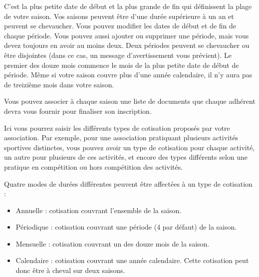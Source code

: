 \documentclass[a4paper,10pt,oneside,french]{sphinxmanual}
\begin{document}
C’est la plus petite date de début et la plus grande de fin qui définissent la plage de votre saison. Vos saisons peuvent être d’une durée supérieure à un an et peuvent se chevaucher.
Vous pouvez modifier les dates de début et de fin de chaque période. Vous pouvez aussi ajouter ou supprimer une période, mais vous devez toujours en avoir au moins deux.
Deux périodes peuvent se chevaucher ou être disjointes (dans ce cas, un message d’avertissement vous prévient).
Le premier des douze mois commence le mois de la plus petite date de début de période. Même si votre saison couvre plus d’une année calendaire, il n’y aura pas de treizième mois dans votre saison.

Vous pouvez associer à chaque saison une liste de documents que chaque adhérent devra vous fournir pour finaliser son inscription.
\begin{quote}

\noindent{}
\end{quote}

\begin{quote}

\noindent{}
\end{quote}

Ici vous pourrez saisir les différents types de cotisation proposés par votre association. Par exemple, pour une association pratiquant plusieurs activités sportives distinctes, vous pouvez avoir un type de cotisation pour chaque activité, un autre pour plusieurs de ces activités, et encore des types différents selon une pratique en compétition ou hors compétition des activités.

Quatre modes de durées différentes peuvent être affectées à un type de cotisation :
\begin{itemize}
\item {} 
Annuelle : cotisation couvrant l’ensemble de la saison.

\item {} 
Périodique : cotisation couvrant une période (4 par défaut) de la saison.

\item {} 
Mensuelle : cotisation couvrant un des douze mois de la saison.

\item {} 
Calendaire : cotisation couvrant une année calendaire. Cette cotisation peut donc être à cheval sur deux saisons.

\end{itemize}
\end{document}
